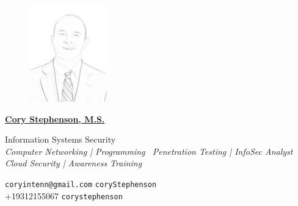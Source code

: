 \documentclass[10pt, oneside, final]{article}
\begin{document}
  \thispagestyle{empty}

  \begin{figure}
  \includegraphics[width = 0.3\textwidth]{./sketch.png}
  \end{figure}

  \underline{\large\textsf{\textbf{Cory Stephenson, M.S.}}}

  {Information Systems Security} \\


  \emph{Computer Networking | Programming \ Penetration Testing | InfoSec Analyst \\ Cloud Security | Awareness Training}

  \vfill
  {\faEnvelope} \texttt{coryintenn@gmail.com} \hfill
  {\faGithub} \texttt{coryStephenson} \\
  {\faPhone} +1{\textendash}931{\textendash}215{\textendash}5067 \hfill
  {\faLinkedin} \texttt{corystephenson}
\end{document}
